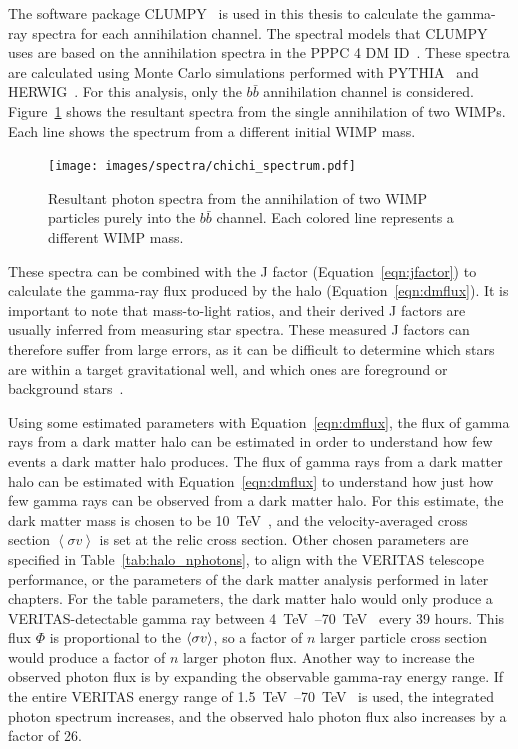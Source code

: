     The software package CLUMPY~\cite{CLUMPYcode} is used in this thesis to calculate the gamma-ray spectra for each annihilation channel.
    The spectral models that CLUMPY uses are based on the annihilation spectra in the PPPC 4 DM ID~\cite{pppc4_dm_spectra,pppc4_ewcorrections}.
    These spectra are calculated using Monte Carlo simulations performed with PYTHIA~\cite{pythia} and HERWIG~\cite{herwig}.
    For this analysis, only the $b\bar{b}$ annihilation channel is considered.
    Figure~\ref{fig:chichi_spectrum} shows the resultant spectra from the single annihilation of two WIMPs.
    Each line shows the spectrum from a different initial WIMP mass.

    \begin{figure}[bt]
      \centering
      \texttt{[image: images/spectra/chichi\_spectrum.pdf]}
      \caption[Single Annihilation Spectra]{
        Resultant photon spectra from the annihilation of two WIMP particles purely into the $b\bar{b}$ channel.
        Each colored line represents a different WIMP mass.
      }
      \label{fig:chichi_spectrum}
    \end{figure}

    These spectra can be combined with the J factor (Equation~\ref{eqn:jfactor}) to calculate the gamma-ray flux produced by the halo (Equation~\ref{eqn:dmflux}).
    It is important to note that mass-to-light ratios, and their derived J factors are usually inferred from measuring star spectra.
    These measured J factors can therefore suffer from large errors, as it can be difficult to determine which stars are within a target gravitational well, and which ones are foreground or background stars~\cite{segue_jfactor_errors}.
    
    Using some estimated parameters with Equation~\ref{eqn:dmflux}, the flux of gamma rays from a dark matter halo can be estimated in order to understand how few events a dark matter halo produces.
    The flux of gamma rays from a dark matter halo can be estimated with Equation~\ref{eqn:dmflux} to understand how just how few gamma rays can be observed from a dark matter halo.
    For this estimate, the dark matter mass is chosen to be \SI{10}{\TeV{}}, and the velocity-averaged cross section $\left < \sigma v \right >$ is set at the relic cross section.
    Other chosen parameters are specified in Table~\ref{tab:halo_nphotons}, to align with the VERITAS telescope performance, or the parameters of the dark matter analysis performed in later chapters.
    For the table parameters, the dark matter halo would only produce a VERITAS-detectable gamma ray between \SIrange{4}{70}{\TeV{}} every 39 hours.
    This flux $\Phi$ is proportional to the $\left < \sigma v \right >$, so a factor of $n$ larger particle cross section would produce a factor of $n$ larger photon flux.
    Another way to increase the observed photon flux is by expanding the observable gamma-ray energy range.
    If the entire VERITAS energy range of \SIrange{1.5}{70}{\TeV{}} is used, the integrated photon spectrum increases, and the observed halo photon flux also increases by a factor of 26.
    
